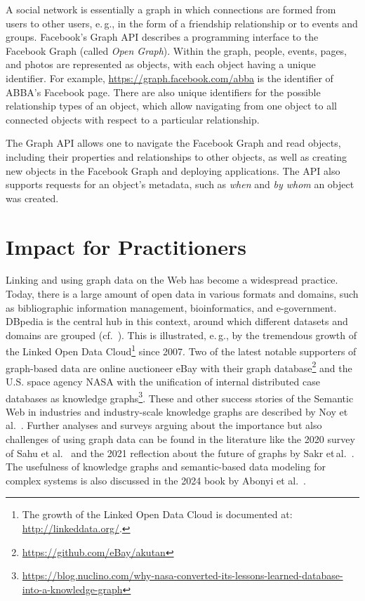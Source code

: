 \documentclass[a4paper,USenglish]{tgdk-v2021}
\newcommand{\arxivonly}[1]{}
\begin{document}
A social network is essentially a graph in which connections are formed from users to other users, e.\,g., in the form of a friendship relationship or to events and groups.
Facebook's Graph API describes a programming interface to the Facebook Graph (called \textit{Open Graph}).
Within the graph, people, events, pages, and photos are represented as objects, with each object having a unique identifier.
For example, \url{https://graph.facebook.com/abba} is the identifier of ABBA's Facebook page.
There are also unique identifiers for the possible relationship types of an object, which allow navigating from one object to all connected objects with respect to a particular relationship.

The Graph API allows one to navigate the Facebook Graph and read objects, including their properties and relationships to other objects, as well as creating new objects in the Facebook Graph and deploying applications.
The API also supports requests for an object's metadata,
such as \textit{when} and \textit{by whom} an object was created.

\section{Impact for Practitioners}
\label{sec:praxis}
\label{sec:impact}

Linking and using graph data on the Web has become a widespread practice. 
Today, there is a large amount of open data in various formats and domains, such as bibliographic information management, bioinformatics, and e-government.
DBpedia is the central hub in this context, around which different datasets and domains are grouped (cf.~\cite{DBLP:journals/expert/Bizer09}).
This is illustrated, e.\,g., by the tremendous growth of the Linked Open Data Cloud\footnote{The growth of the Linked Open Data Cloud is documented at: \url{http://linkeddata.org/}.} since 2007.
Two of the latest notable supporters of graph-based data are online auctioneer eBay with their graph database\footnote{\url{https://github.com/eBay/akutan}} and the U.S. space agency NASA with the unification of internal distributed case databases as knowledge graphs\footnote{\url{https://blog.nuclino.com/why-nasa-converted-its-lessons-learned-database-into-a-knowledge-graph}}.
These and other success stories of the Semantic Web in industries and industry-scale knowledge graphs are described by Noy et al.~\cite{DBLP:journals/cacm/NoyGJNPT19}.
Further analyses and surveys arguing about the importance but also challenges of using graph data can be found in the literature like the 2020 survey of Sahu et al.~\cite{DBLP:journals/vldb/SahuMSLO20} and the 2021 reflection about the future of graphs by Sakr et\,al.~\cite{DBLP:journals/cacm/SakrBVIAAAABBDV21}.
The usefulness of knowledge graphs and semantic-based data modeling for complex systems is also discussed in the 2024 book by Abonyi et al.~\cite{AbonyiEtAl2024OntologiesInIndustry}.
\arxivonly{The importance of graph databases is also reflected by the Forbes business magazine, which predicted in 2019 that graph databases would be the next mainstream database technology\footnote{\url{https://www.forbes.com/sites/cognitiveworld/2019/07/18/graph-databases-go-mainstream}}.}
\end{document}
